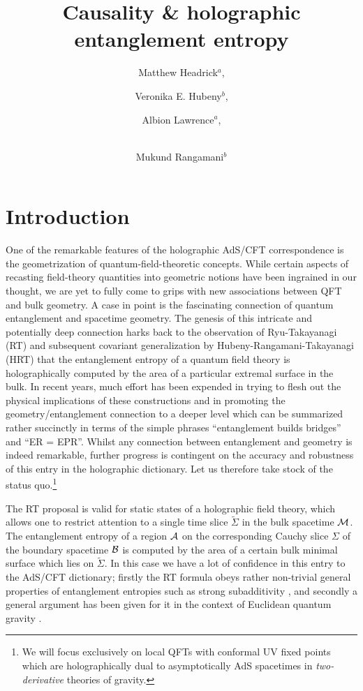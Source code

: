 \documentclass[12pt]{article}
\title{Causality \& holographic entanglement entropy}
\author{Matthew Headrick$^a$,}
\author{Veronika E. Hubeny$^b$,}
\author{Albion Lawrence$^a$,}
\author{ \\  Mukund Rangamani$^b$}
\affiliation[a]{ Martin Fisher School of Physics, Brandeis University, \\
MS 057, 415 South Street, Waltham, MA 02454, USA.}
\affiliation[b]{
Centre for Particle Theory \& Department of Mathematical Sciences,\\
Science Laboratories, South Road, Durham DH1 3LE, UK.}
\def\bulk{{\cal M}}
\def\bdy{{\cal B}}
\def\regA{{\cal A}}
\begin{document}
\maketitle

\newpage

\section{Introduction} \label{sec:intro}


One of the remarkable features of the holographic AdS/CFT correspondence is the geometrization of quantum-field-theoretic concepts. While certain aspects of recasting field-theory quantities into geometric notions have been ingrained in our thought, we are yet to fully come to grips with new associations between QFT and bulk geometry. A case in point is the fascinating connection of quantum entanglement and  spacetime geometry. 
The genesis of this intricate and potentially deep connection harks back to the observation of Ryu-Takayanagi (RT) \cite{Ryu:2006ef,Ryu:2006bv} and subsequent covariant generalization by Hubeny-Rangamani-Takayanagi (HRT) 
\cite{Hubeny:2007xt}  that the entanglement entropy of a quantum field theory is holographically computed by the area of a particular extremal surface in the bulk. In recent years, much effort has been expended in trying to flesh out the physical implications of these constructions and in promoting the geometry/entanglement connection to a deeper level \cite{Swingle:2009bg, VanRaamsdonk:2009ar,VanRaamsdonk:2010pw, Maldacena:2013xja} which can be summarized rather succinctly in terms of the simple phrases ``entanglement builds bridges'' and ``ER = EPR''.
Whilst any connection between entanglement and geometry is indeed remarkable, further progress is contingent on the accuracy and robustness of this entry in the holographic dictionary. Let us therefore take stock of the status quo.\footnote{ We will focus exclusively on local QFTs with conformal UV fixed points  which are holographically dual to asymptotically AdS spacetimes in 
{\em two-derivative} theories of gravity.}

The RT proposal is valid for static states of a holographic field theory, which allows one to restrict attention to a single time slice ${\tilde \Sigma}$ in the bulk spacetime $\bulk$. 
The entanglement entropy of a region $\regA$ on the corresponding
Cauchy slice $\Sigma$ of the boundary spacetime $\bdy$ is computed by the area of a certain bulk minimal surface which lies on ${\tilde \Sigma}$.
In this case we have a lot of confidence in this entry to the AdS/CFT dictionary; firstly the RT formula obeys rather non-trivial general properties of entanglement entropies such as strong subadditivity \cite{Headrick:2007km,Hayden:2011ag,Headrick:2013zda}, and secondly a general argument has been given for it in the context of Euclidean quantum gravity \cite{Lewkowycz:2013nqa}.
\end{document}
